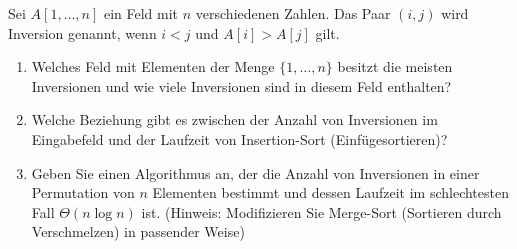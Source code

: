 
\begin{exercise}

Sei $A[1,\dots,n]$ ein Feld mit $n$ verschiedenen Zahlen. Das Paar $(i,j)$ wird Inversion genannt,
wenn $i < j$ und $A[i] > A[j]$ gilt.

\begin{enumerate}[label = (\alph*)]
  \item Welches Feld mit Elementen der Menge $\{1,\dots, n\}$ besitzt die meisten Inversionen und
  wie viele Inversionen sind in diesem Feld enthalten?
  \item Welche Beziehung gibt es zwischen der Anzahl von Inversionen im Eingabefeld und der Laufzeit
  von Insertion-Sort (Einfügesortieren)?
  \item Geben Sie einen Algorithmus an, der die Anzahl von Inversionen in einer Permutation von
  $n$ Elementen bestimmt und dessen Laufzeit im schlechtesten Fall $\Theta(n \log n)$ ist.
  (Hinweis: Modifizieren Sie Merge-Sort (Sortieren durch Verschmelzen) in passender Weise)
\end{enumerate}

\end{exercise}


